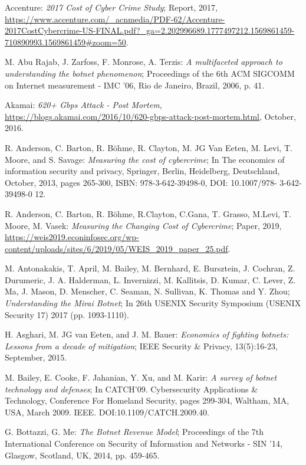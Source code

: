 \begin{thebibliography}{99}
 Accenture: \emph{2017 Cost of Cyber Crime Study}; Report, 2017, \url{https://www.accenture.com/_acnmedia/PDF-62/Accenture-2017CostCybercrime-US-FINAL.pdf?_ga=2.202996689.1777497212.1569861459-710890993.1569861459#zoom=50}.

 M. Abu Rajab, J. Zarfoss, F. Monrose, A. Terzis: \emph{A multifaceted approach to understanding the botnet phenomenon}; Proceedings of the 6th ACM SIGCOMM on Internet measurement  - IMC '06, Rio de Janeiro, Brazil, 2006, p. 41.

 Akamai: \emph{620+ Gbps Attack - Post Mortem}, \url{https://blogs.akamai.com/2016/10/620-gbps-attack-post-mortem.html}, October, 2016.

 R. Anderson, C. Barton, R. Böhme, R. Clayton, M. JG Van Eeten, M. Levi, T. Moore, and S. Savage: \emph{Measuring the cost of cybercrime}; In The economics of information security and privacy, Springer, Berlin, Heidelberg, Deutschland, October, 2013, pages 265-300, ISBN: 978-3-642-39498-0, DOI: 10.1007/978- 3-642-39498-0 12.

 R. Anderson, C. Barton, R. Böhme, R.Clayton, C.Gana, T. Grasso, M.Levi, T. Moore, M. Vasek: \emph{Measuring the Changing Cost of Cybercrime}; Paper, 2019, \url{https://weis2019.econinfosec.org/wp-content/uploads/sites/6/2019/05/WEIS_2019_paper_25.pdf}.

 M. Antonakakis, T. April, M. Bailey, M. Bernhard, E. Bursztein, J. Cochran, Z. Durumeric, J. A. Halderman, L. Invernizzi, M. Kallitsis, D. Kumar, C. Lever, Z. Ma, J. Mason, D. Menscher, C. Seaman, N. Sullivan, K. Thomas and Y. Zhou; \emph{Understanding the Mirai Botnet}; In 26th {USENIX} Security Symposium ({USENIX} Security 17) 2017 (pp. 1093-1110).

 H. Asghari, M. JG van Eeten, and J. M. Bauer: \emph{Economics of fighting botnets: Lessons from a decade of mitigation}; IEEE Security \& Privacy, 13(5):16-23, September, 2015.

 M. Bailey, E. Cooke, F. Jahanian, Y. Xu, and M. Karir: \emph{A survey of botnet technology and defenses}; In CATCH'09. Cybersecurity Applications \& Technology, Conference For Homeland Security, pages 299-304, Waltham, MA, USA, March 2009. IEEE. DOI:10.1109/CATCH.2009.40.

 G. Bottazzi, G. Me: \emph{The Botnet Revenue Model}; Proceedings of the 7th International Conference on Security of Information and Networks - SIN '14, Glasgow, Scotland, UK, 2014, pp. 459-465.


\end{thebibliography}
